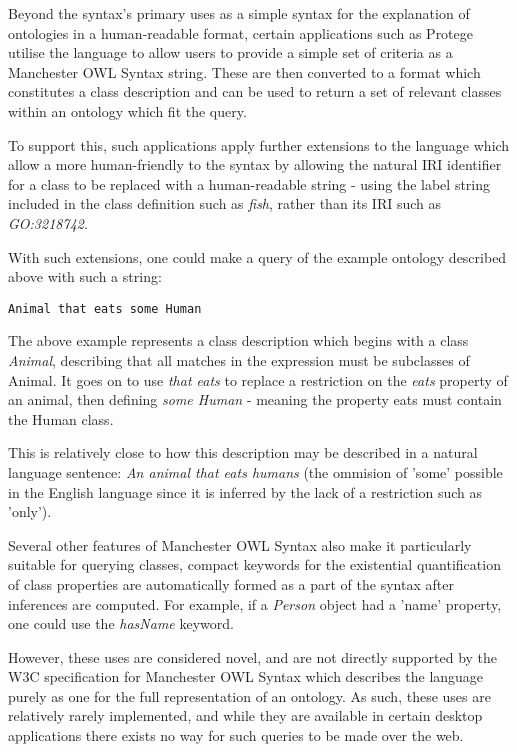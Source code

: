 \documentclass{article}
\begin{document}
Beyond the syntax's primary uses as a simple syntax for the explanation of
ontologies in a human-readable format, certain applications such as Protege
utilise the language to allow users to provide a simple set of criteria as a 
Manchester OWL Syntax string. These are then converted to a format which
constitutes a class description and can be used to return a set of relevant
classes within an ontology which fit the query. 

To support this, such applications apply further extensions to the language
which allow a more human-friendly to the syntax by allowing the natural IRI
identifier for a class to be replaced with a human-readable string - using the
label string included in the class definition such as \emph{fish}, rather than
its IRI such as \emph{GO:3218742}.

With such extensions, one could make a query of the example ontology described
above with such a string:

\begin{lstlisting}
Animal that eats some Human
\end{lstlisting}

The above example represents a class description which begins with a class
\emph{Animal}, describing that all matches in the expression must be subclasses
of Animal. It goes on to use \emph{that eats} to replace a restriction on the
\emph{eats} property of an animal, then defining \emph{some Human} - meaning the
property eats must contain the Human class.

This is relatively close to how this description may be described in a natural
language sentence: \emph{An animal that eats humans} (the ommision of 'some'
possible in the English language since it is inferred by the lack of a
restriction such as 'only').

Several other features of Manchester OWL Syntax also make it particularly
suitable for querying classes, compact keywords for the existential quantification 
of class properties are automatically formed as a part of the syntax after
inferences are computed. For example, if a \emph{Person} object had a 'name'
property, one could use the \emph{hasName} keyword.

However, these uses are considered novel, and are not directly supported by the W3C
specification for Manchester OWL Syntax which describes the language purely as
one for the full representation of an ontology. As such, these uses are relatively rarely
implemented, and while they are available in certain desktop applications there
exists no way for such queries to be made over the web.
\end{document}
